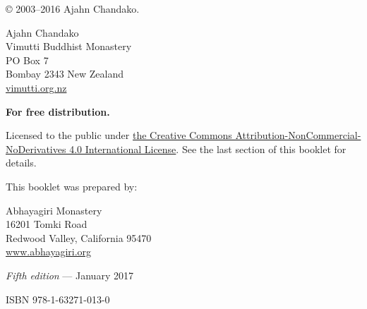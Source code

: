 © 2003--2016 Ajahn Chandako.

\begin{copyrightindent}
  Ajahn Chandako\\
  Vimutti Buddhist Monastery\\
  PO Box 7\\
  Bombay 2343 New Zealand\\
  \href{http://vimutti.org.nz/}{vimutti.org.nz}
\end{copyrightindent}

\textbf{For free distribution.}

Licensed to the public under
\href{https://creativecommons.org/licenses/by-nc-nd/4.0/}{the Creative Commons Attribution-NonCommercial-NoDerivatives 4.0 International License}. See
the last section of this booklet for details.

This booklet was prepared by:

\begin{copyrightindent}
  Abhayagiri Monastery\\
  16201 Tomki Road\\
  Redwood Valley, California 95470\\
  \href{https://www.abhayagiri.org/}{www.abhayagiri.org}
\end{copyrightindent}

\textit{Fifth edition} --- January 2017

ISBN 978-1-63271-013-0
